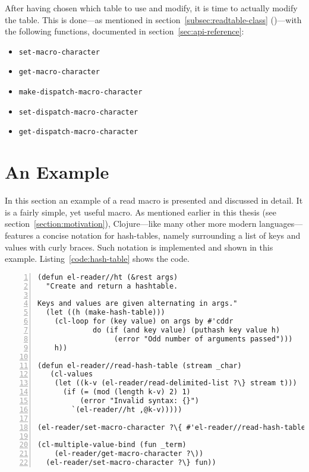 \documentclass[a4paper,10pt,twoside]{report}
\newcommand{\fun}[1]{\texttt{#1}}
\begin{document}
After having chosen which table to use and modify, it is time to actually modify
the table.  This is done---as mentioned in section~\ref{subsec:readtable-class}
()---with the following functions, documented in
section~\ref{sec:api-reference}:

\begin{itemize}
\item \fun{set-macro-character} 
\item \fun{get-macro-character}
\item \fun{make-dispatch-macro-character}
\item \fun{set-dispatch-macro-character}
\item \fun{get-dispatch-macro-character}
\end{itemize}

\section{An Example}
\label{sec:example}

In this section an example of a read macro is presented and discussed in detail.
It is a fairly simple, yet useful macro.  As mentioned earlier in this thesis
(see section~\ref{section:motivation}), Clojure---like many other more modern
languages---features a concise notation for hash-tables, namely surrounding a
list of keys and values with curly braces.  Such notation is implemented and
shown in this example.  Listing~\ref{code:hash-table} shows the code.

\begin{lstlisting}[style=lispcode,label={code:hash-table},caption={Create syntax
    for hash-tables.},numbers=left]
(defun el-reader//ht (&rest args)
  "Create and return a hashtable.

Keys and values are given alternating in args."
  (let ((h (make-hash-table)))
    (cl-loop for (key value) on args by #'cddr
             do (if (and key value) (puthash key value h)
                  (error "Odd number of arguments passed")))
    h))

(defun el-reader//read-hash-table (stream _char)
   (cl-values
    (let ((k-v (el-reader/read-delimited-list ?\} stream t)))
      (if (= (mod (length k-v) 2) 1)
          (error "Invalid syntax: {}")
        `(el-reader//ht ,@k-v)))))

(el-reader/set-macro-character ?\{ #'el-reader//read-hash-table)

(cl-multiple-value-bind (fun _term)
    (el-reader/get-macro-character ?\))
  (el-reader/set-macro-character ?\} fun))
\end{lstlisting}
\end{document}
